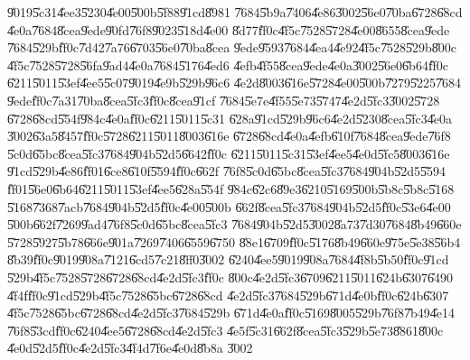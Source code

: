 \documentclass{article}
\begin{document}
\U{9019}\U{5c31}\U{4ee3}\U{5230}\U{4e00}\U{500b}\U{5f88}\U{91cd}\U{8981}%
\U{7684}\U{5b9a}\U{7406}\U{4e86}\U{3002}\U{56e0}\U{70ba}\U{6728}\U{68cd}%
\U{4e0a}\U{7684}\U{8cea}\U{9ede}\U{90fd}\U{76f8}\U{9023}\U{518d}\U{4e00}%
\U{8d77}\U{ff0c}\U{4f5c}\U{7528}\U{5728}\U{4e00}\U{8655}\U{8cea}\U{9ede}%
\U{7684}\U{529b}\U{ff0c}\U{7d42}\U{7a76}\U{6703}\U{56e0}\U{70ba}\U{8cea}%
\U{9ede}\U{9593}\U{7684}\U{4ea4}\U{4e92}\U{4f5c}\U{7528}\U{529b}\U{800c}%
\U{4f5c}\U{7528}\U{5728}\U{56fa}\U{9ad4}\U{4e0a}\U{7684}\U{5176}\U{4ed6}%
\U{4efb}\U{4f55}\U{8cea}\U{9ede}\U{4e0a}\U{3002}\U{56e0}\U{6b64}\U{ff0c}%
\U{6211}\U{5011}\U{53ef}\U{4ee5}\U{5c07}\U{9019}\U{4e9b}\U{529b}\U{96c6}%
\U{4e2d}\U{8003}\U{616e}\U{5728}\U{4e00}\U{500b}\U{7279}\U{5225}\U{7684}%
\U{9ede}\U{ff0c}\U{7a31}\U{70ba}\U{8cea}\U{5fc3}\U{ff0c}\U{8cea}\U{91cf}%
\U{7684}\U{5e7e}\U{4f55}\U{5e73}\U{5747}\U{4e2d}\U{5fc3}\U{3002}\U{5728}%
\U{6728}\U{68cd}\U{554f}\U{984c}\U{4e0a}\U{ff0c}\U{6211}\U{5011}\U{5c31}%
\U{628a}\U{91cd}\U{529b}\U{96c6}\U{4e2d}\U{5230}\U{8cea}\U{5fc3}\U{4e0a}%
\U{3002}\U{63a5}\U{8457}\U{ff0c}\U{5728}\U{6211}\U{5011}\U{8003}\U{616e}%
\U{6728}\U{68cd}\U{4e0a}\U{4efb}\U{610f}\U{7684}\U{8cea}\U{9ede}\U{76f8}%
\U{5c0d}\U{65bc}\U{8cea}\U{5fc3}\U{7684}\U{904b}\U{52d5}\U{6642}\U{ff0c}%
\U{6211}\U{5011}\U{5c31}\U{53ef}\U{4ee5}\U{4e0d}\U{5fc5}\U{8003}\U{616e}%
\U{91cd}\U{529b}\U{4e86}\U{ff01}\U{6ce8}\U{610f}\U{5594}\U{ff0c}\U{662f}%
\U{76f8}\U{5c0d}\U{65bc}\U{8cea}\U{5fc3}\U{7684}\U{904b}\U{52d5}\U{5594}%
\U{ff01}\U{56e0}\U{6b64}\U{6211}\U{5011}\U{53ef}\U{4ee5}\U{628a}\U{554f}%
\U{984c}\U{62c6}\U{89e3}\U{6210}\U{5169}\U{500b}\U{5b8c}\U{5b8c}\U{5168}%
\U{5168}\U{7368}\U{7acb}\U{7684}\U{904b}\U{52d5}\U{ff0c}\U{4e00}\U{500b}%
\U{662f}\U{8cea}\U{5fc3}\U{7684}\U{904b}\U{52d5}\U{ff0c}\U{53e6}\U{4e00}%
\U{500b}\U{662f}\U{7269}\U{9ad4}\U{76f8}\U{5c0d}\U{65bc}\U{8cea}\U{5fc3}%
\U{7684}\U{904b}\U{52d5}\U{3002}\U{8a73}\U{7d30}\U{7684}\U{8b49}\U{660e}%
\U{5728}\U{5927}\U{5b78}\U{666e}\U{901a}\U{7269}\U{7406}\U{6559}\U{6750}%
\U{88e1}\U{6709}\U{ff0c}\U{5176}\U{8b49}\U{660e}\U{975e}\U{5e38}\U{56b4}%
\U{8b39}\U{ff0c}\U{9019}\U{908a}\U{7121}\U{6cd5}\U{7c21}\U{8ff0}\U{3002}%
\U{6240}\U{4ee5}\U{9019}\U{908a}\U{7684}\U{4f8b}\U{5b50}\U{ff0c}\U{91cd}%
\U{529b}\U{4f5c}\U{7528}\U{5728}\U{6728}\U{68cd}\U{4e2d}\U{5fc3}\U{ff0c}%
\U{800c}\U{4e2d}\U{5fc3}\U{6709}\U{6211}\U{5011}\U{624b}\U{6307}\U{6490}%
\U{4f4f}\U{ff0c}\U{91cd}\U{529b}\U{4f5c}\U{7528}\U{65bc}\U{6728}\U{68cd}%
\U{4e2d}\U{5fc3}\U{7684}\U{529b}\U{671d}\U{4e0b}\U{ff0c}\U{624b}\U{6307}%
\U{4f5c}\U{7528}\U{65bc}\U{6728}\U{68cd}\U{4e2d}\U{5fc3}\U{7684}\U{529b}%
\U{671d}\U{4e0a}\U{ff0c}\U{5169}\U{8005}\U{529b}\U{76f8}\U{7b49}\U{4e14}%
\U{76f8}\U{53cd}\U{ff0c}\U{6240}\U{4ee5}\U{6728}\U{68cd}\U{4e2d}\U{5fc3}%
\U{4e5f}\U{5c31}\U{662f}\U{8cea}\U{5fc3}\U{529b}\U{5e73}\U{8861}\U{800c}%
\U{4e0d}\U{52d5}\U{ff0c}\U{4e2d}\U{5fc3}\U{4f4d}\U{7f6e}\U{4e0d}\U{8b8a}%
\U{3002}
\end{document}
